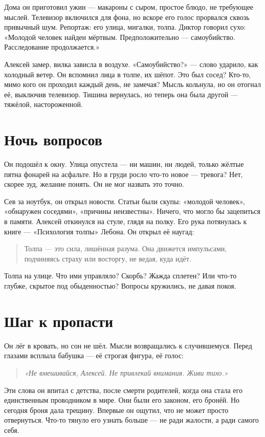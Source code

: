 \documentclass[12pt,a4paper]{book}
\newenvironment{innerthought}{\begin{quote}\small\itshape}{\end{quote}}
\begin{document}
Дома он приготовил ужин --- макароны с сыром, простое блюдо, не требующее мыслей. Телевизор включился для фона, но вскоре его голос прорвался сквозь привычный шум. Репортаж: его улица, мигалки, толпа. Диктор говорил сухо: «Молодой человек найден мёртвым. Предположительно --- самоубийство. Расследование продолжается.»

Алексей замер, вилка зависла в воздухе. «Самоубийство?» --- слово ударило, как холодный ветер. Он вспомнил лица в толпе, их шёпот. Это был сосед? Кто-то, мимо кого он проходил каждый день, не замечая? Мысль кольнула, но он отогнал её, выключив телевизор. Тишина вернулась, но теперь она была другой --- тяжёлой, настороженной.

\section{Ночь вопросов}

Он подошёл к окну. Улица опустела --- ни машин, ни людей, только жёлтые пятна фонарей на асфальте. Но в груди росло что-то новое --- тревога? Нет, скорее зуд, желание понять. Он не мог назвать это точно.

Сев за ноутбук, он открыл новости. Статьи были скупы: «молодой человек», «обнаружен соседями», «причины неизвестны». Ничего, что могло бы зацепиться в памяти. Алексей откинулся на стуле, глядя на полку. Его рука потянулась к книге --- «Психология толпы» Лебона. Он открыл её наугад:

\begin{quote}
Толпа --- это сила, лишённая разума. Она движется импульсами, подчиняясь страху или восторгу, не ведая, куда идёт.
\end{quote}

Толпа на улице. Что ими управляло? Скорбь? Жажда сплетен? Или что-то глубже, скрытое под обыденностью? Вопросы кружились, не давая покоя.

\section{Шаг к пропасти}

Он лёг в кровать, но сон не шёл. Мысли возвращались к случившемуся. Перед глазами всплыла бабушка --- её строгая фигура, её голос:

\begin{innerthought}
«Не вмешивайся, Алексей. Не привлекай внимания. Живи тихо.»
\end{innerthought}

Эти слова он впитал с детства, после смерти родителей, когда она стала его единственным проводником в мире. Они были его законом, его бронёй. Но сегодня броня дала трещину. Впервые он ощутил, что не может просто отвернуться. Что-то тянуло его узнать больше --- не ради жалости, а ради самого себя.
\end{document}
